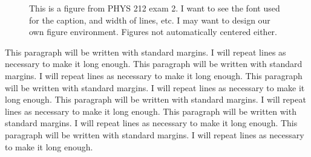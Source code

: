 \documentclass[numbib]{buthesis_p}  %
\begin{document}
\begin{figure}[t]
\begin{center}
\end{center}
\caption[Short caption for figure]{This is a figure from PHYS 212 exam 2.  I
want to see the font used for the caption, and width of lines, etc. I
may want to design our own figure environment.  Figures not
automatically centered either.}
\label{f_speaker}
\end{figure}

This paragraph will be written with standard margins. I will repeat
lines as necessary to make it long enough. This paragraph will be
written with standard margins. I will repeat lines as necessary to
make it long enough. This paragraph will be written with standard
margins. I will repeat lines as necessary to make it long enough.
This paragraph will be written with standard margins. I will repeat
lines as necessary to make it long enough. This paragraph will be
written with standard margins. I will repeat lines as necessary to
make it long enough. This paragraph will be written with standard
margins. I will repeat lines as necessary to make it long enough.
\end{document}
